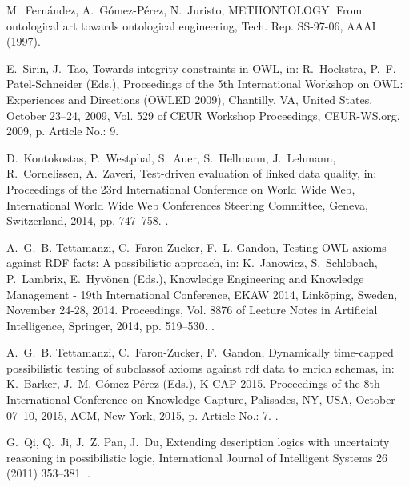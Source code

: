 \documentclass[review]{elsarticle}
\theoremstyle{definition}
\begin{document}
\begin{thebibliography}{10}
M.~Fern\'andez, A.~G\'omez-P\'erez, N.~Juristo, {METHONTOLOGY}: From
  ontological art towards ontological engineering, Tech. Rep. SS-97-06, AAAI
  (1997).

E.~Sirin, J.~Tao, Towards integrity constraints in {OWL}, in: R.~Hoekstra,
  P.~F. Patel-Schneider (Eds.), Proceedings of the 5th International Workshop
  on OWL: Experiences and Directions (OWLED 2009), Chantilly, VA, United
  States, October 23--24, 2009, Vol. 529 of CEUR Workshop Proceedings,
  CEUR-WS.org, 2009, p. Article No.: 9.

D.~Kontokostas, P.~Westphal, S.~Auer, S.~Hellmann, J.~Lehmann, R.~Cornelissen,
  A.~Zaveri, Test-driven evaluation of linked data quality, in: Proceedings of
  the 23rd International Conference on World Wide Web, International World Wide
  Web Conferences Steering Committee, Geneva, Switzerland, 2014, pp. 747--758.
\newblock \href {http://dx.doi.org/10.1145/2566486.2568002}
  {}.

A.~G.~B. Tettamanzi, C.~Faron-Zucker, F.~L. Gandon, Testing {OWL} axioms
  against {RDF} facts: A possibilistic approach, in: K.~Janowicz, S.~Schlobach,
  P.~Lambrix, E.~Hyv\"{o}nen (Eds.), Knowledge Engineering and Knowledge
  Management - 19th International Conference, {EKAW} 2014, Link{\"{o}}ping,
  Sweden, November 24-28, 2014. Proceedings, Vol. 8876 of Lecture Notes in
  Artificial Intelligence, Springer, 2014, pp. 519--530.
\newblock \href {http://dx.doi.org/10.1007/978-3-319-13704-9_39}
  {}.

A.~G.~B. Tettamanzi, C.~Faron-Zucker, F.~Gandon, Dynamically time-capped
  possibilistic testing of subclassof axioms against rdf data to enrich
  schemas, in: K.~Barker, J.~M. G\'omez-P\'erez (Eds.), K-CAP 2015. Proceedings
  of the 8th International Conference on Knowledge Capture, Palisades, NY, USA,
  October 07--10, 2015, ACM, New York, 2015, p. Article No.: 7.
\newblock \href {http://dx.doi.org/10.1145/2815833.2815835}
  {}.

G.~Qi, Q.~Ji, J.~Z. Pan, J.~Du, Extending description logics with uncertainty
  reasoning in possibilistic logic, International Journal of Intelligent
  Systems 26 (2011) 353--381.
\newblock \href {http://dx.doi.org/10.1002/int.20470}
  {}.


\end{thebibliography}
\end{document}

